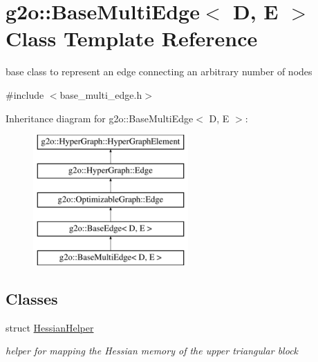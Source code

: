 \hypertarget{classg2o_1_1_base_multi_edge}{}\section{g2o\+:\+:Base\+Multi\+Edge$<$ D, E $>$ Class Template Reference}
\label{classg2o_1_1_base_multi_edge}


base class to represent an edge connecting an arbitrary number of nodes  




{\ttfamily \#include $<$base\+\_\+multi\+\_\+edge.\+h$>$}

Inheritance diagram for g2o\+:\+:Base\+Multi\+Edge$<$ D, E $>$\+:\begin{figure}[H]
\begin{center}
\leavevmode
\includegraphics[height=5.000000cm]{classg2o_1_1_base_multi_edge}
\end{center}
\end{figure}
\subsection*{Classes}
\begin{DoxyCompactItemize}
\item 
struct \mbox{\hyperlink{structg2o_1_1_base_multi_edge_1_1_hessian_helper}{Hessian\+Helper}}
\begin{DoxyCompactList}\small\item\em helper for mapping the Hessian memory of the upper triangular block \end{DoxyCompactList}\end{DoxyCompactItemize}
